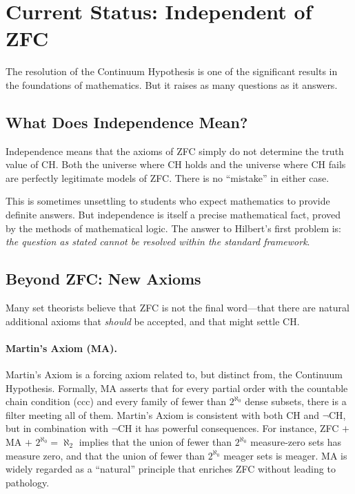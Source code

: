 \section{Current Status: Independent of ZFC}

The resolution of the Continuum Hypothesis is one of the significant results in the foundations of mathematics. But it raises as many questions as it answers.

\subsection{What Does Independence Mean?}

Independence means that the axioms of ZFC simply do not determine the truth value of CH. Both the universe where CH holds and the universe where CH fails are perfectly legitimate models of ZFC. There is no ``mistake'' in either case.

This is sometimes unsettling to students who expect mathematics to provide definite answers. But independence is itself a precise mathematical fact, proved by the methods of mathematical logic. The answer to Hilbert's first problem is: \emph{the question as stated cannot be resolved within the standard framework}.

\subsection{Beyond ZFC: New Axioms}

Many set theorists believe that ZFC is not the final word---that there are natural additional axioms that \emph{should} be accepted, and that might settle CH.

\paragraph{Martin's Axiom (MA).}
Martin's Axiom is a forcing axiom related to, but distinct from, the Continuum Hypothesis. Formally, MA asserts that for every partial order with the countable chain condition (ccc) and every family of fewer than $2^{\aleph_0}$ dense subsets, there is a filter meeting all of them. Martin's Axiom is consistent with both CH and $\neg$CH, but in combination with $\neg$CH it has powerful consequences. For instance, ZFC $+$ MA $+$ $2^{\aleph_0} = \aleph_2$ implies that the union of fewer than $2^{\aleph_0}$ measure-zero sets has measure zero, and that the union of fewer than $2^{\aleph_0}$ meager sets is meager. MA is widely regarded as a ``natural'' principle that enriches ZFC without leading to pathology.


